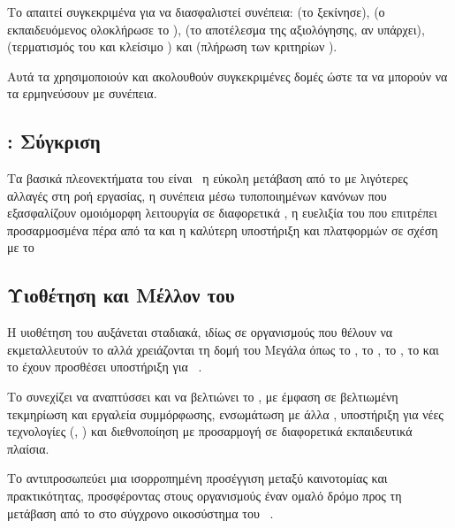 \subsubsection{  }

Το  απαιτεί συγκεκριμένα  για να διασφαλιστεί συνέπεια:  (το  ξεκίνησε),  (ο εκπαιδευόμενος ολοκλήρωσε το ),  (το αποτέλεσμα της αξιολόγησης, αν υπάρχει),  (τερματισμός του  και κλείσιμο ) και  (πλήρωση των κριτηρίων \texttt{}).

Αυτά τα  χρησιμοποιούν    και ακολουθούν συγκεκριμένες δομές ώστε τα  να μπορούν να τα ερμηνεύσουν με συνέπεια.

\subsection{    : Σύγκριση}
\label{subsec:cmi5_comparison}



Τα βασικά πλεονεκτήματα του  είναι~\cite{xapicom2024cmi5comparison} η εύκολη μετάβαση από το  με λιγότερες αλλαγές στη ροή εργασίας, η συνέπεια μέσω τυποποιημένων κανόνων που εξασφαλίζουν ομοιόμορφη λειτουργία σε διαφορετικά , η ευελιξία του  που επιτρέπει προσαρμοσμένα   πέρα από τα  και η καλύτερη υποστήριξη  και  πλατφορμών σε σχέση με το 

\subsection{Υιοθέτηση και Μέλλον του }
\label{subsec:cmi5_adoption}

Η υιοθέτηση του  αυξάνεται σταδιακά, ιδίως σε οργανισμούς που θέλουν να εκμεταλλευτούν το  αλλά χρειάζονται τη δομή του  Μεγάλα  όπως το , το , το  , το  και το  έχουν προσθέσει υποστήριξη για ~\cite{xapicom2024cmi5technical}.

Το  συνεχίζει να αναπτύσσει και να βελτιώνει το , με έμφαση σε βελτιωμένη τεκμηρίωση και εργαλεία συμμόρφωσης, ενσωμάτωση με άλλα  , υποστήριξη για νέες τεχνολογίες (,  ) και διεθνοποίηση με προσαρμογή σε διαφορετικά εκπαιδευτικά πλαίσια.

Το  αντιπροσωπεύει μια ισορροπημένη προσέγγιση μεταξύ καινοτομίας και πρακτικότητας, προσφέροντας στους οργανισμούς έναν ομαλό δρόμο προς τη μετάβαση από το   στο σύγχρονο οικοσύστημα του ~\cite{dtic2024cmi5bestpractices}.


